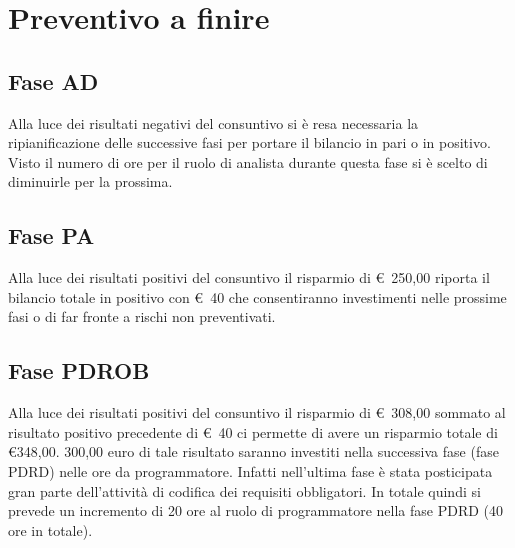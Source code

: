 \documentclass[../PianoProgetto.tex]{subfiles}
\begin{document}
\section{Preventivo a finire}

	\subsection{Fase AD}
		Alla luce dei risultati negativi del consuntivo si è resa necessaria la ripianificazione delle successive fasi per portare il bilancio in pari o in positivo. Visto il numero di ore per il ruolo di analista durante questa fase si è scelto di diminuirle per la prossima.
	
	\subsection{Fase PA}
		Alla luce dei risultati positivi del consuntivo il risparmio di \euro\ 250,00 riporta il bilancio totale in positivo con \euro\ 40 che consentiranno investimenti nelle prossime fasi o di far fronte a rischi non preventivati.
	
	\subsection{Fase PDROB}
		Alla luce dei risultati positivi del consuntivo il risparmio di \euro\ 308,00 sommato al risultato positivo precedente di \euro\ 40 ci permette di avere un risparmio totale di \euro 348,00. 300,00 euro di tale risultato saranno investiti nella successiva fase (fase PDRD) nelle ore da programmatore. Infatti nell'ultima fase è stata posticipata gran parte dell'attività di codifica dei requisiti obbligatori. In totale quindi si prevede un incremento di 20 ore al ruolo di programmatore nella fase PDRD (40 ore in totale).
	
	
\end{document}

